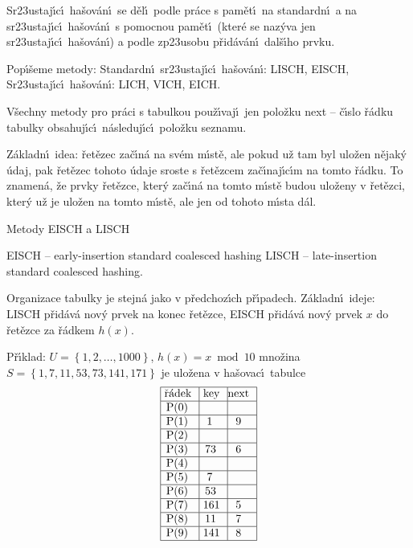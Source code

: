 \flushpar Sr\accent23ustaj\'\i c\'\i\ ha\v sov\'an\'\i\ se d\v el\'\i\ podle pr\'ace s 
pam\v et\'\i\ na standardn\'\i\ a na sr\accent23ustaj\'\i c\'\i\ ha\v sov\'an\'\i\ 
s pomocnou pam\v et\'\i\ (kter\'e se naz\'yva jen 
sr\accent23ustaj\'\i c\'\i\ ha\v sov\'an\'\i ) a podle zp\accent23usobu 
p\v rid\'av\'an\'\i\ dal\v s\'\i ho prvku.
\medskip

\flushpar Pop\'\i\v seme metody:\newline 
\phantom{---}Standardn\'\i\ sr\accent23ustaj\'\i c\'\i\ ha\v sov\'an\'\i: LISCH, EISCH,\newline 
\phantom{---}Sr\accent23ustaj\'\i c\'\i\ ha\v sov\'an\'\i : LICH, VICH, EICH.
\medskip

\flushpar V\v sechny metody pro pr\'aci s tabulkou pou\v z\'\i vaj\'\i\ jen 
polo\v zku next -- \v c\'\i slo \v r\'adku tabulky obsahuj\'\i c\'\i\ 
n\'asleduj\'\i c\'\i\ polo\v zku seznamu. 

\flushpar Z\'akladn\'\i\ idea: \v ret\v ezec za\v c\'\i n\'a na sv\'em m\'\i st\v e, ale 
pokud u\v z tam byl ulo\v zen 
n\v ejak\'y \'udaj, pak \v ret\v ezec tohoto \'udaje sroste s \v ret\v ezcem 
za\v c\'\i naj\'\i c\'\i m na tomto \v r\'adku. To znamen\'a, \v ze prvky \v ret\v ezce, kter\'y za\v c\'\i n\'a na tomto m\'\i st\v e budou ulo\v zeny v \v ret\v ezci, kter\'y u\v z je ulo\v zen na tomto m\'\i st\v e, ale jen od tohoto m\'\i sta d\'al.
\medskip

\subhead
Metody EISCH a LISCH
\endsubhead

\phantom{---}EISCH -- early-insertion standard coalesced hashing\newline 
\phantom{---}LISCH -- late-insertion standard coalesced hashing.
 
\flushpar Organizace tabulky je stejn\'a jako v p\v redchoz\'\i ch 
p\v r\'\i padech.\newline 
Z\'akladn\'\i\ ideje: LISCH p\v rid\'av\'a nov\'y prvek na konec 
\v ret\v ezce, \newline 
EISCH p\v rid\'av\'a nov\'y prvek $x$ do \v ret\v ezce za 
\v r\'adkem $h\left(x\right)$.\newline 

\flushpar P\v r\'\i klad: $U=\left\{1,2,\dots,1000\right\}$, $h\left(x\right)=x\bmod10$\newline 
mno\v zina $S=\left\{1,7,11,53,73,141,171\right\}$ je ulo\v zena 
v ha\v sovac\'\i\ tabulce
$$\vtop{\offinterlineskip\halign {\strut\vrule\ # & \vrule\ # & \vrule \hfil # \hfil \vrule\cr\noalign{\hrule}\v r\'adek & key & next \hfil \cr\noalign{\hrule}P(0) & &\hfill \cr\noalign{\hrule}P(1) & 1 & 9 \cr\noalign{\hrule}P(2) & &\hfill \cr\noalign{\hrule}P(3) & 73 & 6 \cr\noalign{\hrule}P(4) &  &\hfill \cr\noalign{\hrule}P(5) & 7 & \hfill \cr\noalign{\hrule}P(6) & 53 &\hfill \cr\noalign{\hrule}P(7) & 161 & 5 \cr\noalign{\hrule}P(8) & 11 & 7  \cr\noalign{\hrule}P(9) & 141 & 8 \cr\noalign{\hrule}}}$$

